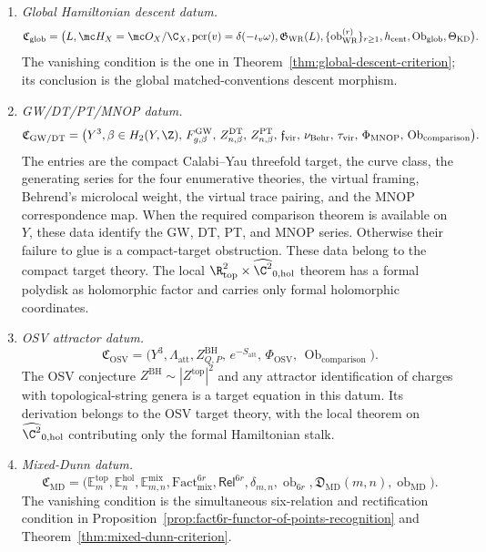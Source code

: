 \begin{defn}
\begin{enumerate}[label=(\roman*)]
      local \(d=2\) Hamiltonian theorem.
    \item \emph{Global Hamiltonian descent datum.}
      \[
      \mathfrak C_{\mathrm{glob}}=
      \bigl(L,\mc H_X=\mc O_X/\C_X,
      \operatorname{per}(v)=\delta(-\iota_v\omega),
      \mathfrak G_{\mathrm{WR}}(L),
      \{\operatorname{ob}^{(r)}_{\mathrm{WR}}\}_{r\ge1},
      h_{\mathrm{cent}},\operatorname{Ob}_{\mathrm{glob}},
      \Theta_{\mathrm{KD}}\bigr).
      \]
      The vanishing condition is the one in
      Theorem~\ref{thm:global-descent-criterion}; its conclusion is the
      global matched-conventions descent morphism.
    \item \emph{GW/DT/PT/MNOP datum.}
      \[
      \mathfrak C_{\mathrm{GW/DT}}=
      \bigl(Y^3,\beta\in H_2(Y,\Z),\,
      F^{\mathrm{GW}}_{g,\beta},\,Z^{\mathrm{DT}}_{n,\beta},\,
      Z^{\mathrm{PT}}_{n,\beta},\,
      \mathfrak f_{\mathrm{vir}},\,\nu_{\mathrm{Behr}},\,
      \tau_{\mathrm{vir}},\,\Phi_{\mathrm{MNOP}},\,
      \operatorname{Ob}_{\mathrm{comparison}}\bigr).
      \]
      The entries are the compact Calabi--Yau threefold target, the curve class,
      the generating series for the four enumerative theories, the
	      virtual framing, Behrend's microlocal weight, the virtual trace
	      pairing, and the MNOP correspondence map.  When the required
	      comparison theorem is available on \(Y\), these data identify the
	      GW, DT, PT, and MNOP series.  Otherwise their failure to glue is a
	      compact-target obstruction.  These data belong to the compact
	      target theory.  The local
      \(\R^2_{\mathrm{top}}\times\widehat{\C^2}_{0,\mathrm{hol}}\)
      theorem has a formal polydisk as holomorphic factor and carries
      only formal holomorphic coordinates.
    \item \emph{OSV attractor datum.}
      \[
      \mathfrak C_{\mathrm{OSV}}=
      \bigl(Y^3,\Lambda_{\mathrm{att}},
      Z^{\mathrm{BH}}_{Q,P},\,e^{-S_{\mathrm{att}}},\,
      \Phi_{\mathrm{OSV}},\,
      \operatorname{Ob}_{\mathrm{comparison}}\bigr).
      \]
      The OSV conjecture
      \(Z^{\mathrm{BH}}\sim|Z^{\mathrm{top}}|^2\) and any attractor
      identification of charges with topological-string genera is a
      target equation in this datum.  Its derivation belongs to the OSV
      target theory, with the local theorem on
      \(\widehat{\C^2}_{0,\mathrm{hol}}\) contributing only the formal
      Hamiltonian stalk.
    \item \emph{Mixed-Dunn datum.}
      \[
      \mathfrak C_{\mathrm{MD}}=
      \bigl(\mathbb E_m^{\mathrm{top}},\mathbb E_n^{\mathrm{hol}},
      \mathbb E_{m,n}^{\mathrm{mix}},
      \mathrm{Fact}^{6r}_{\mathrm{mix}},
      \mathsf{Rel}^{6r},\delta_{m,n},
      \operatorname{ob}_{6r},
      \mathfrak D_{\mathrm{MD}}(m,n),
      \operatorname{ob}_{\mathrm{MD}}\bigr).
      \]
      The vanishing condition is the simultaneous six-relation and
      rectification condition in
      Proposition~\ref{prop:fact6r-functor-of-points-recognition} and
      Theorem~\ref{thm:mixed-dunn-criterion}.
  \end{enumerate}
\end{defn}

